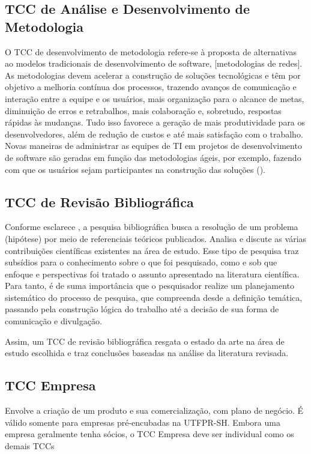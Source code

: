 \subsection{TCC de Análise e Desenvolvimento de Metodologia}\label{sec:AnaliseDese}
O TCC de desenvolvimento de metodologia refere-se à proposta de alternativas ao modelos tradicionais de desenvolvimento de software, [metodologias de redes]. As metodologias devem acelerar a construção de soluções tecnológicas e têm por objetivo a melhoria contínua dos processos, trazendo avanços de comunicação e interação entre a equipe e os usuários, mais organização para o alcance de metas, diminuição de erros e retrabalhos, mais colaboração e, sobretudo, respostas rápidas às mudanças. Tudo isso favorece a geração de mais produtividade para os desenvolvedores, além de redução de custos e até mais satisfação com o trabalho. Novas maneiras de administrar as equipes de TI em projetos de desenvolvimento de software são geradas em função das metodologias ágeis, por exemplo, fazendo com que os usuários sejam participantes na construção das soluções (\cite{Sommerville2011}). 

\subsection{TCC de Revisão Bibliográfica}\label{sec:RevisaoBib}
Conforme esclarece \cite{Boccato2006},  a pesquisa bibliográfica busca a resolução de um problema (hipótese) por meio de referenciais teóricos publicados. Analisa e discute as várias contribuições científicas existentes na área de estudo. Esse tipo de pesquisa traz subsídios para o conhecimento sobre o que foi pesquisado, como e sob que enfoque e perspectivas foi tratado o assunto apresentado na literatura científica. Para tanto, é de suma importância que o pesquisador realize um planejamento sistemático do processo de pesquisa, que compreenda desde a definição temática, passando pela construção lógica do trabalho até a decisão de sua forma de comunicação e divulgação.

Assim, um TCC de revisão bibliográfica resgata o estado da arte na área de estudo escolhida e traz conclusões baseadas na análise da literatura revisada.

\subsection{TCC Empresa}\label{sec:Empresa}
Envolve a criação de um produto e sua comercialização, com plano de negócio. É válido somente para empresas pré-encubadas na UTFPR-SH. Embora uma empresa geralmente tenha sócios, o TCC Empresa deve ser individual como os demais TCCs

